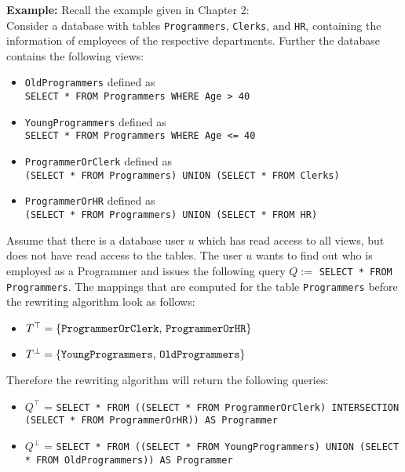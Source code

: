 \smallskip
\noindent
{\bf Example:}
Recall the example given in Chapter 2:
\\
Consider a database with tables \texttt{Programmers}, \texttt{Clerks}, and \texttt{HR}, containing the information of employees of the respective departments.
%
Further the database contains the following views:
\begin{itemize}
	\item \texttt{OldProgrammers} defined as \\ \texttt{SELECT * FROM Programmers WHERE Age > 40}
	\item \texttt{YoungProgrammers} defined as \\ \texttt{SELECT * FROM Programmers WHERE Age <= 40}
	\item \texttt{ProgrammerOrClerk} defined as \\ \texttt{(SELECT * FROM Programmers) UNION (SELECT * FROM Clerks)}
	\item \texttt{ProgrammerOrHR} defined as \\ \texttt{(SELECT * FROM Programmers) UNION (SELECT * FROM HR)}
\end{itemize}
%
Assume that there is a database user $u$ which has read access to all views, but does not have read access to the tables.
%
The user $u$ wants to find out who is employed as a Programmer and issues the following query $Q := $ \texttt{SELECT * FROM Programmers}.
%
The mappings that are computed for the table \texttt{Programmers} before the rewriting algorithm look as follows: 
\begin{itemize}
	\item $T^\top = \lbrace \text{\texttt{ProgrammerOrClerk}, \texttt{ProgrammerOrHR}} \rbrace$ 
	\item $T^\bot = \lbrace \text{\texttt{YoungProgrammers}, \texttt{OldProgrammers}} \rbrace$
\end{itemize}
%
Therefore the rewriting algorithm will return the following queries:
\begin{itemize}
	\item $Q^\top$ = \texttt{SELECT * FROM ((SELECT * FROM ProgrammerOrClerk) INTERSECTION (SELECT * FROM ProgrammerOrHR)) AS Programmer}
	\item $Q^\bot$ = \texttt{SELECT * FROM ((SELECT * FROM YoungProgrammers) UNION (SELECT * FROM OldProgrammers)) AS Programmer}
\end{itemize}


